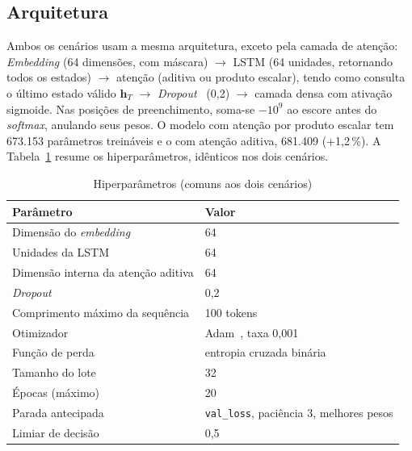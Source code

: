 \documentclass[conference]{IEEEtran}
\begin{document}
\subsection{Arquitetura}
Ambos os cenários usam a mesma arquitetura, exceto pela camada de atenção: \textit{Embedding} (64 dimensões, com máscara) $\rightarrow$ LSTM (64 unidades, retornando todos os estados) $\rightarrow$ atenção (aditiva ou produto escalar), tendo como consulta o último estado válido $\mathbf{h}_T$ $\rightarrow$ \textit{Dropout}~\cite{srivastava2014} (0,2) $\rightarrow$ camada densa com ativação sigmoide. Nas posições de preenchimento, soma-se $-10^{9}$ ao escore antes do \textit{softmax}, anulando seus pesos. O modelo com atenção por produto escalar tem 673.153 parâmetros treináveis e o com atenção aditiva, 681.409 (+1,2\,\%). A Tabela~\ref{tab:hiper} resume os hiperparâmetros, idênticos nos dois cenários.

\begin{table}[!t]
\caption{Hiperparâmetros (comuns aos dois cenários)}
\label{tab:hiper}
\centering
\footnotesize
\begin{tabular}{ll}
\toprule
Parâmetro & Valor \\
\midrule
Dimensão do \textit{embedding} & 64 \\
Unidades da LSTM & 64 \\
Dimensão interna da atenção aditiva & 64 \\
\textit{Dropout} & 0,2 \\
Comprimento máximo da sequência & 100 tokens \\
Otimizador & Adam~\cite{kingma2015}, taxa 0,001 \\
Função de perda & entropia cruzada binária \\
Tamanho do lote & 32 \\
Épocas (máximo) & 20 \\
Parada antecipada & \texttt{val\_loss}, paciência 3, melhores pesos \\
Limiar de decisão & 0,5 \\
\bottomrule
\end{tabular}
\end{table}
\end{document}
